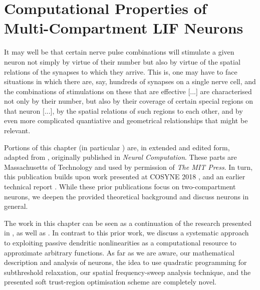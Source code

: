 \chapter{Computational Properties of Multi-Compartment LIF Neurons}
\label{chp:nlif}

\vspace{20pt}

\begin{OpeningQuote}
It may well be that certain nerve pulse combinations will stimulate a given neuron not simply by virtue of their number but also by virtue of the spatial relations of the synapses to which they arrive. This is, one may have to face situations in which there are, say, hundreds of synapses on a single nerve cell, and the combinations of stimulations on these that are effective [...] are characterised not only by their number, but also by their coverage of certain special regions on that neuron [...], by the spatial relations of such regions to each other, and by even more complicated quantiative and geometrical relationships that might be relevant.
\end{OpeningQuote}

\begin{PriorPublication}
Portions of this chapter (in particular ) are, in extended and edited form, adapted from \citet{stoeckel2021}, originally published in \emph{Neural Computation}. These parts are  Massachusetts of Technology and used by permission of \emph{The MIT Press}.
In turn, this publication builds upon work presented at COSYNE 2018 \citep{stockel2018nonlinear}, and an earlier technical report \citep{stockel2017point}.
While these prior publications focus on two-compartment \LIF neurons, we deepen the provided theoretical background and discuss \nlif neurons in general.
\end{PriorPublication}

\begin{Contributions}
The work in this chapter can be seen as a continuation of the research presented in \citet[Chapter~5]{koch1999biophysics}, as well as \citet[Chapter~4]{tripp2009search}.
In contrast to this prior work, we discuss a systematic approach to exploiting passive dendritic nonlinearities as a computational resource to approximate arbitrary functions.
As far as we are aware, our mathematical description and analysis of \nlif neurons, the idea to use quadratic programming for subthreshold relaxation, our spatial frequency-sweep analysis technique, and the presented soft trust-region optimisation scheme are completely novel.
\end{Contributions}

